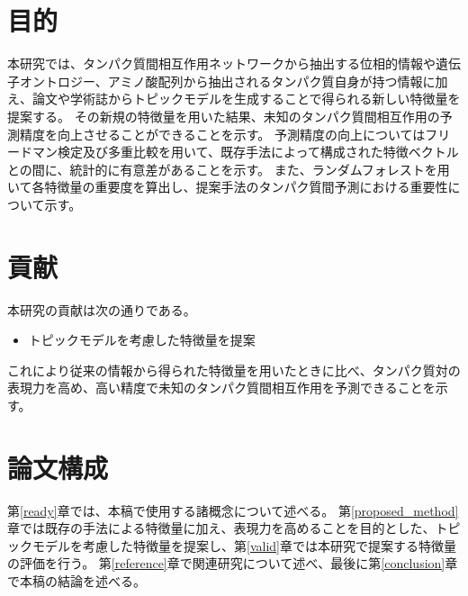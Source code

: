 \documentclass[titlepage,12pt]{jreport}
\begin{document}


\section{目的}
本研究では、タンパク質間相互作用ネットワークから抽出する位相的情報や遺伝子オントロジー、アミノ酸配列から抽出されるタンパク質自身が持つ情報に加え、論文や学術誌からトピックモデルを生成することで得られる新しい特徴量を提案する。 その新規の特徴量を用いた結果、未知のタンパク質間相互作用の予測精度を向上させることができることを示す。 予測精度の向上についてはフリードマン検定及び多重比較を用いて、既存手法によって構成された特徴ベクトルとの間に、統計的に有意差があることを示す。 また、ランダムフォレストを用いて各特徴量の重要度を算出し、提案手法のタンパク質間予測における重要性について示す。

\section{貢献}
本研究の貢献は次の通りである。
\begin{itemize}
\item トピックモデルを考慮した特徴量を提案
\end{itemize}
これにより従来の情報から得られた特徴量を用いたときに比べ、タンパク質対の表現力を高め、高い精度で未知のタンパク質間相互作用を予測できることを示す。
\section{論文構成}
第\ref{ready}章では、本稿で使用する諸概念について述べる。 第\ref{proposed_method}章では既存の手法による特徴量に加え、表現力を高めることを目的とした、トピックモデルを考慮した特徴量を提案し、第\ref{valid}章では本研究で提案する特徴量の評価を行う。 第\ref{reference}章で関連研究について述べ、最後に第\ref{conclusion}章で本稿の結論を述べる。
%
\end{document}
